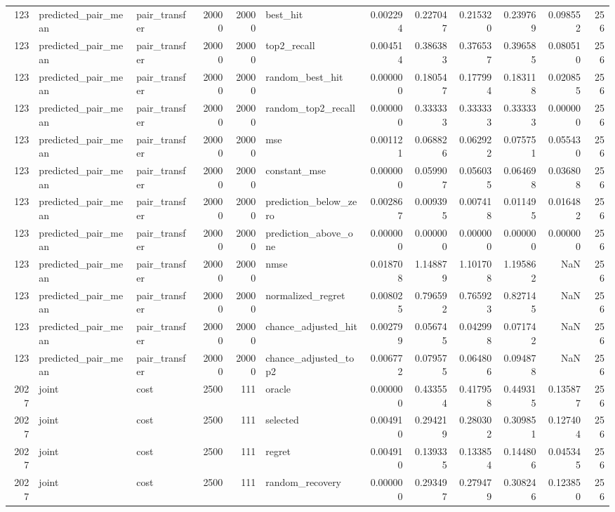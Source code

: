 \begin{tabular}{rllrrlrrrrrr}
123 & predicted_pair_mean & pair_transfer & 20000 & 20000 & best_hit & 0.002294 & 0.227047 & 0.215320 & 0.239769 & 0.098552 & 256 \\
123 & predicted_pair_mean & pair_transfer & 20000 & 20000 & top2_recall & 0.004514 & 0.386383 & 0.376537 & 0.396585 & 0.080510 & 256 \\
123 & predicted_pair_mean & pair_transfer & 20000 & 20000 & random_best_hit & 0.000000 & 0.180547 & 0.177994 & 0.183118 & 0.020855 & 256 \\
123 & predicted_pair_mean & pair_transfer & 20000 & 20000 & random_top2_recall & 0.000000 & 0.333333 & 0.333333 & 0.333333 & 0.000000 & 256 \\
123 & predicted_pair_mean & pair_transfer & 20000 & 20000 & mse & 0.001121 & 0.068826 & 0.062922 & 0.075751 & 0.055430 & 256 \\
123 & predicted_pair_mean & pair_transfer & 20000 & 20000 & constant_mse & 0.000000 & 0.059907 & 0.056035 & 0.064698 & 0.036808 & 256 \\
123 & predicted_pair_mean & pair_transfer & 20000 & 20000 & prediction_below_zero & 0.002867 & 0.009395 & 0.007418 & 0.011495 & 0.016482 & 256 \\
123 & predicted_pair_mean & pair_transfer & 20000 & 20000 & prediction_above_one & 0.000000 & 0.000000 & 0.000000 & 0.000000 & 0.000000 & 256 \\
123 & predicted_pair_mean & pair_transfer & 20000 & 20000 & nmse & 0.018708 & 1.148879 & 1.101708 & 1.195862 & NaN & 256 \\
123 & predicted_pair_mean & pair_transfer & 20000 & 20000 & normalized_regret & 0.008025 & 0.796592 & 0.765923 & 0.827145 & NaN & 256 \\
123 & predicted_pair_mean & pair_transfer & 20000 & 20000 & chance_adjusted_hit & 0.002799 & 0.056745 & 0.042998 & 0.071742 & NaN & 256 \\
123 & predicted_pair_mean & pair_transfer & 20000 & 20000 & chance_adjusted_top2 & 0.006772 & 0.079575 & 0.064806 & 0.094878 & NaN & 256 \\
2027 & joint & cost & 2500 & 111 & oracle & 0.000000 & 0.433554 & 0.417958 & 0.449315 & 0.135877 & 256 \\
2027 & joint & cost & 2500 & 111 & selected & 0.004910 & 0.294219 & 0.280302 & 0.309851 & 0.127404 & 256 \\
2027 & joint & cost & 2500 & 111 & regret & 0.004910 & 0.139335 & 0.133854 & 0.144806 & 0.045345 & 256 \\
2027 & joint & cost & 2500 & 111 & random_recovery & 0.000000 & 0.293497 & 0.279479 & 0.308246 & 0.123850 & 256 \\

\end{tabular}
